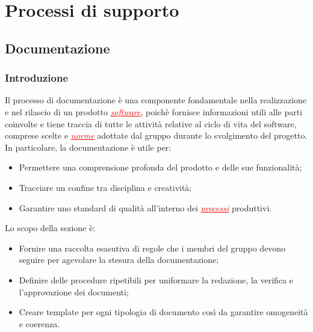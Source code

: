 \section{Processi di supporto}

\subsection{Documentazione}
\subsubsection{Introduzione}
Il processo di documentazione è una componente fondamentale nella realizzazione e nel rilascio di un prodotto \textcolor{red}{\uline{\textit{software}}},
poichè fornisce informazioni utili alle parti coinvolte e tiene traccia di tutte le attività relative al ciclo di vita del software,
comprese scelte e \textcolor{red}{\uline{\textit{norme}}} adottate dal gruppo durante lo svolgimento del progetto. In particolare, la documentazione è utile per:
\begin{itemize}
    \item Permettere una comprensione profonda del prodotto e delle sue funzionalità;
    \item Tracciare un confine tra disciplina e creatività;
    \item Garantire uno standard di qualità all'interno dei \textcolor{red}{\uline{\textit{processi}}} produttivi.
\end{itemize} 
Lo scopo della sezione è:
\begin{itemize}
    \item Fornire una raccolta esasutiva di regole che i membri del gruppo devono seguire per agevolare la stesura della documentazione;
    \item Definire delle procedure ripetibili per uniformare la redazione, la verifica e l'approvazione dei documenti;
    \item Creare template per ogni tipologia di documento così da garantire omogeneità e coerenza.
\end{itemize}


